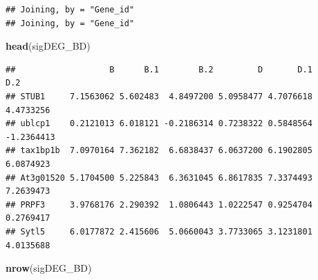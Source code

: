 \documentclass[
]{article}
\newenvironment{Shaded}{\begin{snugshade}}{\end{snugshade}}
\newcommand{\DataTypeTok}[1]{\textcolor[rgb]{0.13,0.29,0.53}{#1}}
\newcommand{\DecValTok}[1]{\textcolor[rgb]{0.00,0.00,0.81}{#1}}
\newcommand{\KeywordTok}[1]{\textcolor[rgb]{0.13,0.29,0.53}{\textbf{#1}}}
\newcommand{\NormalTok}[1]{#1}
\newcommand{\OperatorTok}[1]{\textcolor[rgb]{0.81,0.36,0.00}{\textbf{#1}}}
\newcommand{\OtherTok}[1]{\textcolor[rgb]{0.56,0.35,0.01}{#1}}
\newcommand{\StringTok}[1]{\textcolor[rgb]{0.31,0.60,0.02}{#1}}
\begin{document}
\begin{Shaded}
\end{Shaded}

\begin{verbatim}
## Joining, by = "Gene_id"
## Joining, by = "Gene_id"
\end{verbatim}

\begin{Shaded}
\begin{Highlighting}[]
\KeywordTok{head}\NormalTok{(sigDEG_BD)}
\end{Highlighting}
\end{Shaded}

\begin{verbatim}
##                   B      B.1        B.2         D       D.1        D.2
## STUB1     7.1563062 5.602483  4.8497200 5.0958477 4.7076618  4.4733256
## ublcp1    0.2121013 6.018121 -0.2186314 0.7238322 0.5848564 -1.2364413
## tax1bp1b  7.0970164 7.362182  6.6838437 6.0637200 6.1902805  6.0874923
## At3g01520 5.1704500 5.225843  6.3631045 6.8617835 7.3374493  7.2639473
## PRPF3     3.9768176 2.290392  1.0806443 1.0222547 0.9254704  0.2769417
## Sytl5     6.0177872 2.415606  5.0660043 3.7733065 3.1231801  4.0135688
\end{verbatim}

\begin{Shaded}
\begin{Highlighting}[]
\KeywordTok{nrow}\NormalTok{(sigDEG_BD)}
\end{Highlighting}
\end{Shaded}
\end{document}
